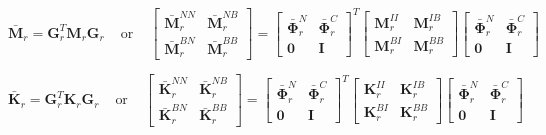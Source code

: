 \documentclass[../DomainDecomposition.tex]{subfiles}
\begin{document}
\begin{equation}
    \bar{\mathbf{M}}_{r} 
    =
    \mathbf{G}_{r}^{T} \mathbf{M}_{r} \mathbf{G}_{r}
    \phantom{xx} 
    \text{or} 
    \phantom{xx} 
    \begin{bmatrix}
        \bar{\mathbf{M}}_{r}^{NN} & 
        \bar{\mathbf{M}}_{r}^{NB} \\
        \bar{\mathbf{M}}_{r}^{BN} & 
        \bar{\mathbf{M}}_{r}^{BB} 
    \end{bmatrix}
    =
    \begin{bmatrix}
        \bar{\mathbf{\Phi}}_{r}^{N} &
        \bar{\mathbf{\Phi}}_{r}^{C} \\ 
        \mathbf{0} & 
        \mathbf{I} 
    \end{bmatrix}^{T} 
    \begin{bmatrix}
        \mathbf{M}_{r}^{II} & 
        \mathbf{M}_{r}^{IB} \\
        \mathbf{M}_{r}^{BI} & 
        \mathbf{M}_{r}^{BB} 
    \end{bmatrix}
    \begin{bmatrix}
        \bar{\mathbf{\Phi}}_{r}^{N} &
        \bar{\mathbf{\Phi}}_{r}^{C} \\ 
        \mathbf{0} & 
        \mathbf{I} 
    \end{bmatrix}
\end{equation}

\begin{equation}
    \bar{\mathbf{K}}_{r} 
    =
    \mathbf{G}_{r}^{T} \mathbf{K}_{r} \mathbf{G}_{r}
    \phantom{xx} 
    \text{or} 
    \phantom{xx} 
    \begin{bmatrix}
        \bar{\mathbf{K}}_{r}^{NN} & 
        \bar{\mathbf{K}}_{r}^{NB} \\
        \bar{\mathbf{K}}_{r}^{BN} & 
        \bar{\mathbf{K}}_{r}^{BB} 
    \end{bmatrix}
    =
    \begin{bmatrix}
        \bar{\mathbf{\Phi}}_{r}^{N} &
        \bar{\mathbf{\Phi}}_{r}^{C} \\ 
        \mathbf{0} & 
        \mathbf{I} 
    \end{bmatrix}^{T} 
    \begin{bmatrix}
        \mathbf{K}_{r}^{II} & 
        \mathbf{K}_{r}^{IB} \\
        \mathbf{K}_{r}^{BI} & 
        \mathbf{K}_{r}^{BB} 
    \end{bmatrix}
    \begin{bmatrix}
        \bar{\mathbf{\Phi}}_{r}^{N} &
        \bar{\mathbf{\Phi}}_{r}^{C} \\ 
        \mathbf{0} & 
        \mathbf{I} 
    \end{bmatrix}
\end{equation}
\end{document}
